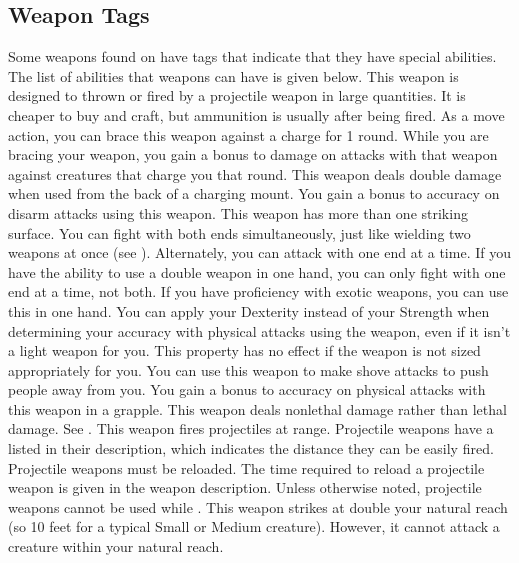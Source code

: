     \subsection{Weapon Tags}
        Some weapons found on  have tags that indicate that they have special abilities. The list of abilities that weapons can have is given below.
         This weapon is designed to thrown or fired by a projectile weapon in large quantities. It is cheaper to buy and craft, but ammunition is usually  after being fired.
         As a move action, you can brace this weapon against a charge for 1 round. While you are bracing your weapon, you gain a  bonus to damage on attacks with that weapon against creatures that charge you that round.
         This weapon deals double damage when used from the back of a charging mount.
         You gain a  bonus to accuracy on disarm attacks using this weapon.
         This weapon has more than one striking surface. You can fight with both ends simultaneously, just like wielding two weapons at once (see ). Alternately, you can attack with one end at a time. If you have the ability to use a double weapon in one hand, you can only fight with one end at a time, not both.
         If you have proficiency with exotic weapons, you can use this in one hand.
         You can apply your Dexterity instead of your Strength when determining your accuracy with physical attacks using the weapon, even if it isn't a light weapon for you.
        This property has no effect if the weapon is not sized appropriately for you.
         You can use this weapon to make shove attacks to push people away from you. %
         You gain a  bonus to accuracy on physical attacks with this weapon in a grapple.
         This weapon deals nonlethal damage rather than lethal damage. See .
         This weapon fires projectiles at range. Projectile weapons have a  listed in their description, which indicates the distance they can be easily fired. Projectile weapons must be reloaded. The time required to reload a projectile weapon is given in the weapon description.
        Unless otherwise noted, projectile weapons cannot be used while \prone.
        \label{Reach Weapon} This weapon strikes at double your natural reach (so 10 feet for a typical Small or Medium creature). However, it cannot attack a creature within your natural reach.

